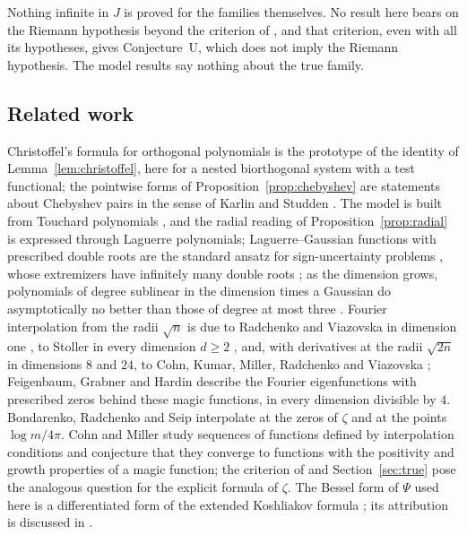 Nothing infinite in $J$ is proved for the families themselves. No result here bears on the Riemann hypothesis beyond the
criterion of \cite{PaperI}, and that criterion, even with all its hypotheses, gives Conjecture~U, which does not imply the
Riemann hypothesis. The model results say nothing about the true family.

\subsection{Related work}\label{ssec:intro-related}

Christoffel's formula for orthogonal polynomials \cite[Theorem~2.5]{Sze75} is the prototype of the identity of
Lemma~\ref{lem:christoffel}, here for a nested biorthogonal system with a test functional; the pointwise forms of
Proposition~\ref{prop:chebyshev} are statements about Chebyshev pairs in the sense of Karlin and Studden \cite{KS66}. The
model is built from Touchard polynomials \cite{Tou39,Com74}, and the radial reading of Proposition~\ref{prop:radial} is
expressed through Laguerre polynomials; Laguerre--Gaussian functions with prescribed double roots are the standard ansatz
for sign-uncertainty problems \cite{CG19}, whose extremizers have infinitely many double roots \cite{GOS17}; as the dimension grows,
polynomials of degree sublinear in the dimension times a Gaussian do asymptotically no better than those of degree at most
three \cite{CDG24}. Fourier interpolation from the radii $\sqrt n$ is due to Radchenko and Viazovska in dimension one \cite{RV19},
to Stoller in every dimension $d\ge2$ \cite{Sto21}, and, with derivatives at the radii $\sqrt{2n}$ in dimensions $8$ and $24$,
to Cohn, Kumar, Miller, Radchenko and Viazovska \cite{CKMRV22}; Feigenbaum, Grabner and Hardin \cite{FGH21} describe the Fourier
eigenfunctions with prescribed zeros behind these magic functions, in every dimension divisible by $4$. Bondarenko, Radchenko and Seip
\cite{BRS} interpolate at the zeros of $\zeta$ and at the points $\log m/4\pi$. Cohn and Miller \cite{CM16} study sequences of
functions defined by interpolation conditions and conjecture that they converge to functions with the positivity and growth
properties of a magic function; the criterion of \cite[Theorem~D]{PaperI} and Section~\ref{sec:true} pose the analogous question for
the explicit formula of $\zeta$. The Bessel form of $\Psi$ used here is a differentiated form of the
extended Koshliakov formula \cite{Kos29,Dix12}; its attribution is discussed in \cite{PaperI}.

